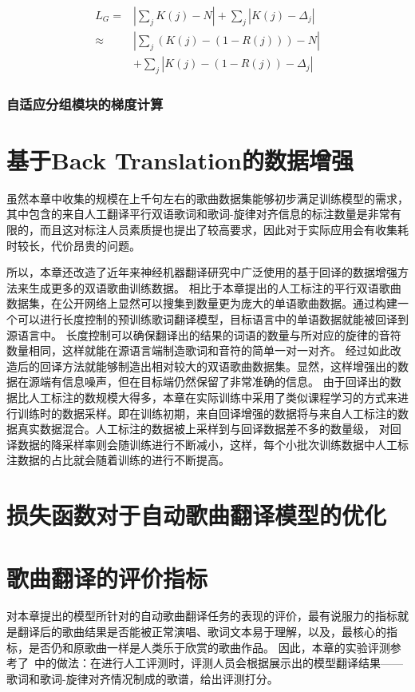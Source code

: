 \begin{equation}
\begin{array}{rl}
    L_G = & \left| \sum_j K(j) - N \right| + \sum_j \left|K(j) - \Delta_j\right| \\
    \approx &\left|\sum_j \left(K(j) - (1 - R(j))\right) - N \right| \\
    & + \sum_j \left|K(j) - (1 - R(j)) - \Delta_j\right|
\end{array}
\end{equation}
\subsubsection{自适应分组模块的梯度计算}


\section{基于Back Translation的数据增强}
\label{sec:bta}
虽然本章中收集的规模在上千句左右的歌曲数据集能够初步满足训练模型的需求，其中包含的来自人工翻译平行双语歌词和歌词-旋律对齐信息的标注数量是非常有限的，而且这对标注人员素质提也提出了较高要求，因此对于实际应用会有收集耗时较长，代价昂贵的问题。

所以，本章还改造了近年来神经机器翻译研究中广泛使用的基于回译的数据增强方法\citep{backtrans}来生成更多的双语歌曲训练数据。
相比于本章提出的人工标注的平行双语歌曲数据集，在公开网络上显然可以搜集到数量更为庞大的单语歌曲数据。通过构建一个可以进行长度控制的预训练歌词翻译模型，目标语言中的单语数据就能被回译到源语言中。
长度控制可以确保翻译出的结果的词语的数量与所对应的旋律的音符数量相同，这样就能在源语言端制造歌词和音符的简单一对一对齐。
经过如此改造后的回译方法就能够制造出相对较大的双语歌曲数据集。显然，这样增强出的数据在源端有信息噪声，但在目标端仍然保留了非常准确的信息。
由于回译出的数据比人工标注的数规模大得多，本章在实际训练中采用了类似课程学习的方式来进行训练时的数据采样。即在训练初期，来自回译增强的数据将与来自人工标注的数据真实数据混合。人工标注的数据被上采样到与回译数据差不多的数量级，
对回译数据的降采样率则会随训练进行不断减小，这样，每个小批次训练数据中人工标注数据的占比就会随着训练的进行不断提高。

\section{损失函数对于自动歌曲翻译模型的优化}
\section{歌曲翻译的评价指标}
对本章提出的模型所针对的自动歌曲翻译任务的表现的评价，最有说服力的指标就是翻译后的歌曲结果是否能被正常演唱、歌词文本易于理解，以及，最核心的指标，是否仍和原歌曲一样是人类乐于欣赏的歌曲作品。
因此，本章的实验评测参考了\citet{songmass}~中的做法：在进行人工评测时，评测人员会根据展示出的模型翻译结果——歌词和歌词-旋律对齐情况制成的歌谱，给出评测打分。

